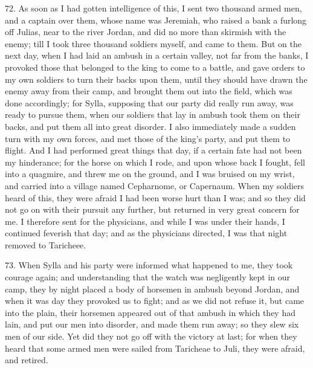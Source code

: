 72. As soon as I had gotten intelligence of this, I sent two thousand
armed men, and a captain over them, whose name was Jeremiah, who raised a
bank a furlong off Julias, near to the river Jordan, and did no more than
skirmish with the enemy; till I took three thousand soldiers myself, and
came to them. But on the next day, when I had laid an ambush in a certain
valley, not far from the banks, I provoked those that belonged to the king
to come to a battle, and gave orders to my own soldiers to turn their
backs upon them, until they should have drawn the enemy away from their
camp, and brought them out into the field, which was done accordingly; for
Sylla, supposing that our party did really run away, was ready to pursue
them, when our soldiers that lay in ambush took them on their backs, and
put them all into great disorder. I also immediately made a sudden turn
with my own forces, and met those of the king's party, and put them to
flight. And I had performed great things that day, if a certain fate had
not been my hinderance; for the horse on which I rode, and upon whose back
I fought, fell into a quagmire, and threw me on the ground, and I was
bruised on my wrist, and carried into a village named Cepharnome, or
Capernaum. When my soldiers heard of this, they were afraid I had been
worse hurt than I was; and so they did not go on with their pursuit any
further, but returned in very great concern for me. I therefore sent for
the physicians, and while I was under their hands, I continued feverish
that day; and as the physicians directed, I was that night removed to
Taricheee.

73. When Sylla and his party were informed what happened to me, they took
courage again; and understanding that the watch was negligently kept in
our camp, they by night placed a body of horsemen in ambush beyond Jordan,
and when it was day they provoked us to fight; and as we did not refuse
it, but came into the plain, their horsemen appeared out of that ambush in
which they had lain, and put our men into disorder, and made them run
away; so they slew six men of our side. Yet did they not go off with the
victory at last; for when they heard that some armed men were sailed from
Taricheae to Juli, they were afraid, and retired.

